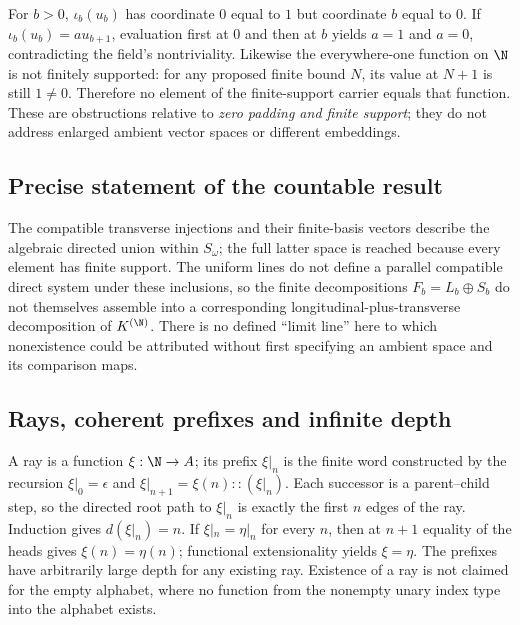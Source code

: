 For $b>0$, $\iota_b(u_b)$ has coordinate $0$ equal to $1$ but coordinate $b$ equal to $0$. If $\iota_b(u_b)=au_{b+1}$, evaluation first at $0$ and then at $b$ yields $a=1$ and $a=0$, contradicting the field's nontriviality. Likewise the everywhere-one function on $\N$ is not finitely supported: for any proposed finite bound $N$, its value at $N+1$ is still $1\ne0$. Therefore no element of the finite-support carrier equals that function. These are obstructions relative to \emph{zero padding and finite support}; they do not address enlarged ambient vector spaces or different embeddings.

\subsection{Precise statement of the countable result}\label{supp:9-5}
\par{}\par\smallskip

The compatible transverse injections and their finite-basis vectors describe the algebraic directed union within $S_\omega$; the full latter space is reached because every element has finite support. The uniform lines do not define a parallel compatible direct system under these inclusions, so the finite decompositions $F_b=L_b\oplus S_b$ do not themselves assemble into a corresponding longitudinal-plus-transverse decomposition of $K^{(\N)}$. There is no defined ``limit line'' here to which nonexistence could be attributed without first specifying an ambient space and its comparison maps.

\subsection{Rays, coherent prefixes and infinite depth}\label{supp:10-1}
\par{}\par\smallskip

A ray is a function $\xi:\N\to A$; its prefix $\xi|_n$ is the finite word constructed by the recursion $\xi|_0=\epsilon$ and $\xi|_{n+1}=\xi(n)::(\xi|_n)$. Each successor is a parent--child step, so the directed root path to $\xi|_n$ is exactly the first $n$ edges of the ray. Induction gives $d(\xi|_n)=n$. If $\xi|_n=\eta|_n$ for every $n$, then at $n+1$ equality of the heads gives $\xi(n)=\eta(n)$; functional extensionality yields $\xi=\eta$. The prefixes have arbitrarily large depth for any existing ray. Existence of a ray is not claimed for the empty alphabet, where no function from the nonempty unary index type into the alphabet exists.

